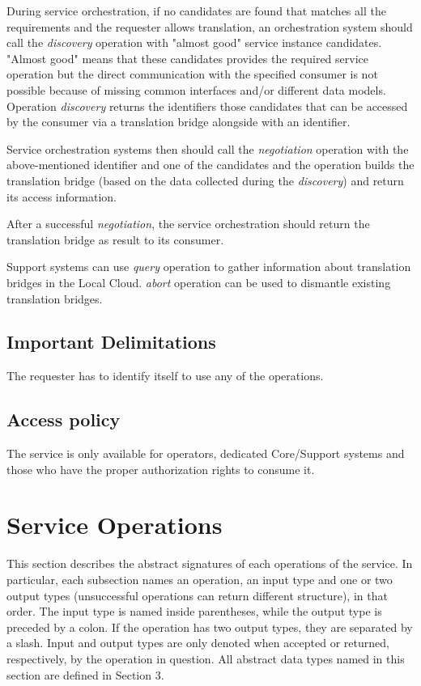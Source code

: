 \documentclass[a4paper]{arrowhead}
\begin{document}
During service orchestration, if no candidates are found that matches all the requirements and the requester allows translation, an orchestration system should call the \textit{discovery} operation with "almost good" service instance candidates. "Almost good" means that these candidates provides the required service operation but the direct communication with the specified consumer is not possible because of missing common interfaces and/or different data models. Operation \textit{discovery} returns the identifiers those candidates that can be accessed by the consumer via a translation bridge alongside with an identifier.

Service orchestration systems then should call the \textit{negotiation} operation with the above-mentioned identifier and one of the candidates and the operation builds the translation bridge (based on the data collected during the \textit{discovery}) and return its access information.

After a successful \textit{negotiation}, the service orchestration should return the translation bridge as result to its consumer.

Support systems can use \textit{query} operation to gather information about translation bridges in the Local Cloud. \textit{abort} operation can be used to dismantle existing translation bridges.

\subsection{Important Delimitations}
\label{sec:delimitations}

The requester has to identify itself to use any of the operations.

\subsection{Access policy}
\label{sec:accesspolicy}

The service is only available for operators, dedicated Core/Support systems and those who have the proper authorization rights to consume it.

\newpage

\section{Service Operations}
\label{sec:functions}

This section describes the abstract signatures of each operations of the service. In particular, each subsection names an operation, an input type and one or two output types (unsuccessful operations can return different structure), in that order.
The input type is named inside parentheses, while the output type is preceded by a colon. If the operation has two output types, they are separated by a slash.
Input and output types are only denoted when accepted or returned, respectively, by the operation in question. All abstract data types named in this section are defined in Section 3.
\end{document}
